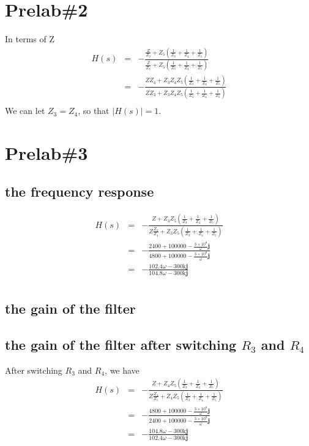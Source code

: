 \documentclass{IEEEtran}
\begin{document}
	\section{\textbf{Prelab\#2}}
	In terms of Z\\
	\begin{eqnarray*}
		H(s) & = & -\frac{\frac{Z}{Z_3}+Z_5(\frac{1}{Z_3}+\frac{1}{Z_4}+\frac{1}{Z_5})} {\frac{Z}{Z_4}+Z_5(\frac{1}{Z_3}+\frac{1}{Z_4}+\frac{1}{Z_5})}\\
		& = &-\frac{ZZ_4+Z_3Z_4Z_5(\frac{1}{Z_3}+\frac{1}{Z_4}+\frac{1}{Z_5})} {ZZ_3+Z_3Z_4Z_5(\frac{1}{Z_3}+\frac{1}{Z_4}+\frac{1}{Z_5})}\\	
	\end{eqnarray*}
	\phantom{ } We can let $ Z_3 = Z_4 $, so that $ |H(s)| = 1 $.
	\section{\textbf{Prelab\#3}}
	\subsection{the frequency response}
	\begin{eqnarray*}
		H(s) & = & -\frac{Z + Z_3Z_5(\frac{1}{Z_3}+\frac{1}{Z_4}+\frac{1}{Z_5})} {Z\frac{Z_3}{Z_4}+Z_3Z_5(\frac{1}{Z_3}+\frac{1}{Z_4}+\frac{1}{Z_5})}\\
		& = & - \frac{2400+100000-\frac{3\times10^8}{\omega}\mathbf{j}} {4800+100000-\frac{3\times10^8}{\omega}\mathbf{j}}\\
		& = & - \frac{102.4\omega - 300\mathrm{k}\mathbf{j}}{104.8\omega - 300\mathrm{k}\mathbf{j}}\\
	\end{eqnarray*}
	\subsection{the gain of the filter}
	\subsection{the gain of the filter after switching $ R_3 $ and $ R_4 $}
	After switching $ R_3 $ and $ R_4 $, we have\\
	\begin{eqnarray*}
		H(s) & = & -\frac{Z + Z_4Z_5(\frac{1}{Z_3}+\frac{1}{Z_4}+\frac{1}{Z_5})} {Z\frac{Z_4}{Z_5}+Z_4Z_5(\frac{1}{Z_3}+\frac{1}{Z_4}+\frac{1}{Z_5})}\\
		& = & - \frac{4800+100000-\frac{3\times10^8}{\omega}\mathbf{j}} {2400+100000-\frac{3\times10^8}{\omega}\mathbf{j}}\\
		& = & - \frac{104.8\omega - 300\mathrm{k}\mathbf{j}}{102.4\omega - 300\mathrm{k}\mathbf{j}}\\
	\end{eqnarray*}
\end{document}
